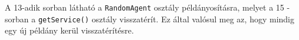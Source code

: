 \pagebreak


A 13-adik sorban látható a \texttt{RandomAgent} osztály példányosításra, melyet a 15 -sorban a \texttt{getService()} osztály visszatérít. Ez által valósul meg az, hogy mindig egy új példány kerül visszatérítésre.





